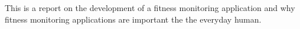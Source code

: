 This is a report on the development of a fitness monitoring application and why fitness monitoring applications are important the the everyday human.
